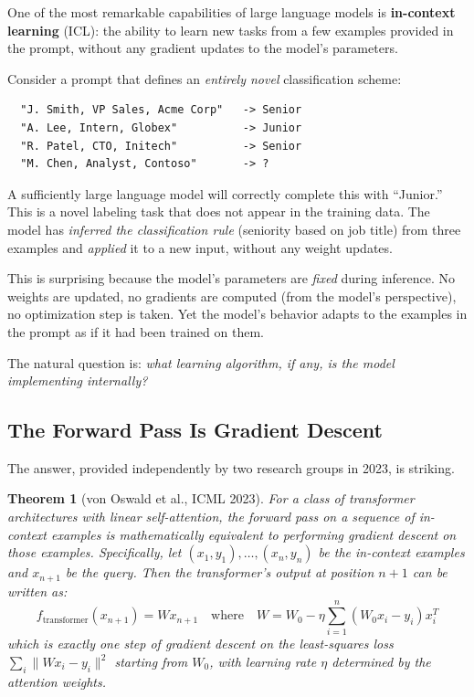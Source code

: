\documentclass[11pt, a4paper]{article}
\theoremstyle{definition}
\theoremstyle{plain}
\newtheorem{theorem}{Theorem}[section]
\begin{document}
One of the most remarkable capabilities of large language models is
\textbf{in-context learning} (ICL): the ability to learn new tasks from
a few examples provided in the prompt, without any gradient updates to
the model's parameters.

\begin{examplebox}[title={In-Context Learning}]
Consider a prompt that defines an \emph{entirely novel} classification
scheme:
\begin{verbatim}
  "J. Smith, VP Sales, Acme Corp"   -> Senior
  "A. Lee, Intern, Globex"          -> Junior
  "R. Patel, CTO, Initech"          -> Senior
  "M. Chen, Analyst, Contoso"       -> ?
\end{verbatim}
A sufficiently large language model will correctly complete this with
``Junior.''  This is a novel labeling task that does not appear in the
training data.  The model has \emph{inferred the classification rule}
(seniority based on job title) from three examples and \emph{applied}
it to a new input, without any weight updates.
\end{examplebox}

This is surprising because the model's parameters are \emph{fixed} during
inference.  No weights are updated, no gradients are computed (from the
model's perspective), no optimization step is taken.  Yet the model's
behavior adapts to the examples in the prompt as if it had been trained on
them.

The natural question is: \emph{what learning algorithm, if any, is the
model implementing internally?}

\subsection{The Forward Pass Is Gradient Descent}
\label{sec:icl_gd}

The answer, provided independently by two research groups in 2023, is
striking.

\begin{theorem}[von Oswald et al., ICML 2023]
\label{thm:icl_gd}
For a class of transformer architectures with linear self-attention,
the forward pass on a sequence of in-context examples is mathematically
equivalent to performing gradient descent on those examples.
Specifically, let $(x_1, y_1), \ldots, (x_n, y_n)$ be the in-context
examples and $x_{n+1}$ be the query.  Then the transformer's output at
position $n+1$ can be written as:
\begin{equation}
  f_{\text{transformer}}(x_{n+1}) = W x_{n+1}
  \quad\text{where}\quad
  W = W_0 - \eta \sum_{i=1}^{n} (W_0 x_i - y_i) x_i^T
  \label{eq:icl_gd}
\end{equation}
which is exactly one step of gradient descent on the least-squares loss
$\sum_i \|Wx_i - y_i\|^2$ starting from $W_0$, with learning rate $\eta$
determined by the attention weights.
\end{theorem}
\end{document}
